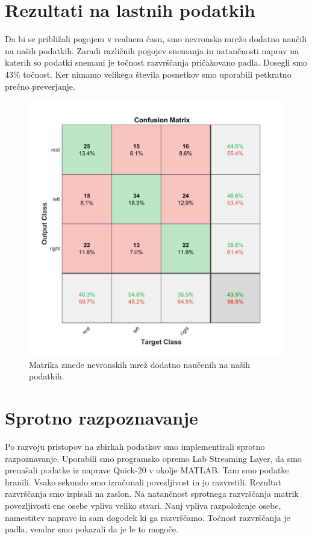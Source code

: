 \section{Rezultati na lastnih podatkih}
Da bi se približali pogojem v realnem času, smo nevronsko mrežo dodatno naučili na naših podatkih. Zaradi različnih pogojev snemanja in natančnosti naprav na katerih so podatki snemani je točnost razvrščanja pričakovano padla. Dosegli smo 43\% točnost. Ker nimamo velikega števila posnetkov smo uporabili petkratno prečno preverjanje. 
\begin{figure}
\begin{center}
\includegraphics[width=0.8\linewidth]{slike/Confusion_13-20Hz_0s-4s_retrained.png}
\end{center}
\caption{Matrika zmede nevronskih mrež dodatno naučenih na naših podatkih.}
\end{figure}


\section{Sprotno razpoznavanje}
Po razvoju pristopov na zbirkah podatkov smo implementirali sprotno razpoznavanje. Uporabili smo programsko opremo Lab Streaming Layer, da smo prenašali podatke iz naprave Quick-20 v okolje MATLAB. Tam smo podatke hranili. Vsako sekundo smo izračunali povezljivost in jo razvrstili. Rezultat razvrščanja smo izpisali na zaslon. Na natančnost sprotnega razvrščanja matrik povezljivosti ene osebe vpliva veliko stvari. Nanj vpliva razpoloženje osebe, namestitev naprave in sam dogodek ki ga razvrščamo. Točnost razvrščanja je padla, vendar smo pokazali da je le to mogoče.

